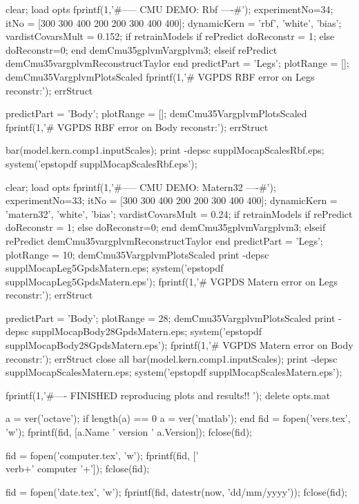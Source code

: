 \documentclass{article} %
\newenvironment{matlab}{\comment}{\endcomment}
\begin{document}
\begin{matlab}

clear; load opts
fprintf(1,'\n\n#-----  CMU DEMO: Rbf ----#\n');
experimentNo=34; 
itNo = [300 300 400 200 200 300 400 400];
dynamicKern = {'rbf', 'white', 'bias'};
vardistCovarsMult = 0.152;
if retrainModels 
    if rePredict
        doReconstr = 1;
    else
        doReconstr=0;
    end
    demCmu35gplvmVargplvm3;
elseif rePredict
    demCmu35vargplvmReconstructTaylor
end
predictPart = 'Legs';  plotRange = [];
demCmu35VargplvmPlotsScaled
fprintf(1,'# VGPDS RBF error on Legs reconstr:');
errStruct

predictPart = 'Body';  plotRange = [];
demCmu35VargplvmPlotsScaled
fprintf(1,'# VGPDS RBF error on Body reconstr:');
errStruct

bar(model.kern.comp{1}.inputScales);
print -depsc supplMocapScalesRbf.eps; system('epstopdf supplMocapScalesRbf.eps');


clear; load opts
fprintf(1,'\n\n#-----  CMU DEMO: Matern32 ----#\n');
experimentNo=33; 
itNo = [300 300 400 200 200 300 400 400];
dynamicKern = {'matern32', 'white', 'bias'};
vardistCovarsMult = 0.24;
if retrainModels 
    if rePredict
        doReconstr = 1;
    else
        doReconstr=0;
    end
    demCmu35gplvmVargplvm3;
elseif rePredict
    demCmu35vargplvmReconstructTaylor
end
predictPart = 'Legs'; plotRange = 10;
demCmu35VargplvmPlotsScaled
print -depsc supplMocapLeg5GpdsMatern.eps; system('epstopdf supplMocapLeg5GpdsMatern.eps');
fprintf(1,'# VGPDS Matern error on Legs reconstr:');
errStruct

predictPart = 'Body'; plotRange = 28;
demCmu35VargplvmPlotsScaled
print -depsc supplMocapBody28GpdsMatern.eps; system('epstopdf supplMocapBody28GpdsMatern.eps');
fprintf(1,'# VGPDS Matern error on Body reconstr:');
errStruct
close all
bar(model.kern.comp{1}.inputScales);
print -depsc supplMocapScalesMatern.eps; system('epstopdf supplMocapScalesMatern.eps');


fprintf(1,'\n\n#---- FINISHED reproducing plots and results!! \n');
delete opts.mat


a = ver('octave');
if length(a) == 0
  a = ver('matlab');
end
fid = fopen('vers.tex', 'w');
fprintf(fid, [a.Name ' version ' a.Version]);
fclose(fid);

fid = fopen('computer.tex', 'w');
fprintf(fid, ['\\verb+' computer '+']);
fclose(fid);

fid = fopen('date.tex', 'w');
fprintf(fid, datestr(now, 'dd/mm/yyyy'));
fclose(fid);

\end{matlab}
\end{document}
